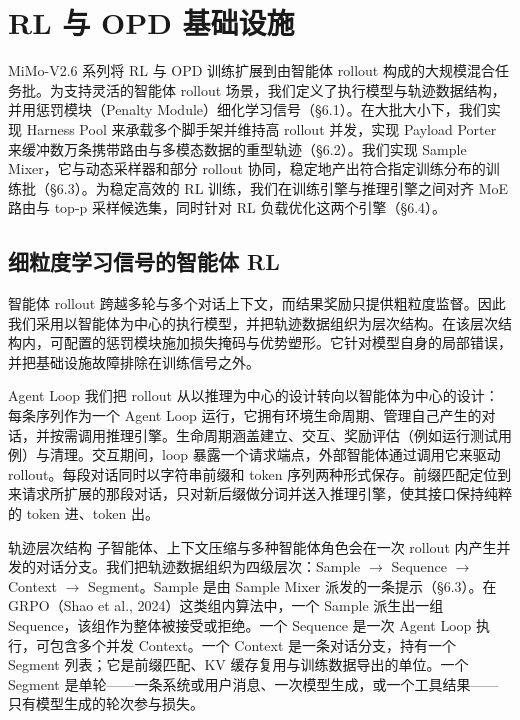 \documentclass[
  10
]{article}
\begin{document}
\section{RL 与 OPD 基础设施}\label{rl-and-opd-infrastructure}

MiMo-V2.6 系列将 RL 与 OPD 训练扩展到由智能体 rollout 构成的大规模混合任务批。为支持灵活的智能体 rollout 场景，我们定义了执行模型与轨迹数据结构，并用惩罚模块（Penalty Module）细化学习信号（§6.1）。在大批大小下，我们实现 Harness Pool 来承载多个脚手架并维持高 rollout 并发，实现 Payload Porter 来缓冲数万条携带路由与多模态数据的重型轨迹（§6.2）。我们实现 Sample Mixer，它与动态采样器和部分 rollout 协同，稳定地产出符合指定训练分布的训练批（§6.3）。为稳定高效的 RL 训练，我们在训练引擎与推理引擎之间对齐 MoE 路由与 top-p 采样候选集，同时针对 RL 负载优化这两个引擎（§6.4）。

\subsection{细粒度学习信号的智能体 RL}\label{agentic-rl-with-fine-grained-learning-signals}

智能体 rollout 跨越多轮与多个对话上下文，而结果奖励只提供粗粒度监督。因此我们采用以智能体为中心的执行模型，并把轨迹数据组织为层次结构。在该层次结构内，可配置的惩罚模块施加损失掩码与优势塑形。它针对模型自身的局部错误，并把基础设施故障排除在训练信号之外。



Agent Loop 我们把 rollout 从以推理为中心的设计转向以智能体为中心的设计：每条序列作为一个 Agent Loop 运行，它拥有环境生命周期、管理自己产生的对话，并按需调用推理引擎。生命周期涵盖建立、交互、奖励评估（例如运行测试用例）与清理。交互期间，loop 暴露一个请求端点，外部智能体通过调用它来驱动 rollout。每段对话同时以字符串前缀和 token 序列两种形式保存。前缀匹配定位到来请求所扩展的那段对话，只对新后缀做分词并送入推理引擎，使其接口保持纯粹的 token 进、token 出。

轨迹层次结构 子智能体、上下文压缩与多种智能体角色会在一次 rollout 内产生并发的对话分支。我们把轨迹数据组织为四级层次：Sample $\to$ Sequence $\to$ Context $\to$ Segment。Sample 是由 Sample Mixer 派发的一条提示（§6.3）。在 GRPO（Shao et al., 2024）这类组内算法中，一个 Sample 派生出一组 Sequence，该组作为整体被接受或拒绝。一个 Sequence 是一次 Agent Loop 执行，可包含多个并发 Context。一个 Context 是一条对话分支，持有一个 Segment 列表；它是前缀匹配、KV 缓存复用与训练数据导出的单位。一个 Segment 是单轮——一条系统或用户消息、一次模型生成，或一个工具结果——只有模型生成的轮次参与损失。
\end{document}
